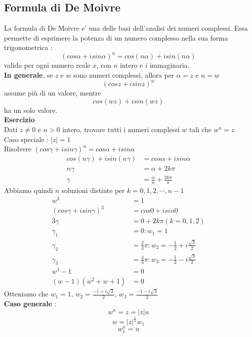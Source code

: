 \documentclass[a4paper, 10pt]{article}
\begin{document}
	\subsection{Formula di De Moivre}
	La formula di De Moivre e' una delle basi dell'analisi dei numeri complessi. 
	Essa permette di esprimere la potenza di un numero complesso nella sua forma trigonometrica : 
	\[
		(cos \alpha + i sin \alpha)^{n} = cos(n\alpha) + isin(n\alpha)
	\]
	valida per ogni numero reale $x$, con $n$ intero e $i$ immaginaria. \\
	\textbf{In generale}, se $z$ e $w$ sono numeri complessi, allora per $\alpha = z$ e $n = w$  
	\[
		(cosz + isinz)^{w}
	\]
	assume più di un valore, mentre
	\[
		cos(wz) + isin(wz)
	\]
	ha un solo valore. \\
	\textbf{Esercizio} \\
	Dati $z \neq 0$ e $n > 0$ intero, trovare tutti i numeri complessi $w$ tali che $w^{n} = z$ \\
	Caso speciale : $\vert z \vert = 1$	\\
	Risolvere $(cos \gamma + i sin \gamma )^{n} = cos \alpha + i sin \alpha $
	\begin{equation*}
		\begin{split}
		cos(n\gamma) + isin(n\gamma) &= cos\alpha + isin\alpha \\
		n\gamma &= \alpha + 2k \pi \\
		\gamma &= \frac{\alpha}{n} + \frac{2k\pi}{n}
		\end{split}
	\end{equation*}
	Abbiamo quindi $n$ soluzioni distinte per $k = 0, 1, 2, \cdots, n - 1$ \\
	\begin{equation*}
		\begin{split}
			w^3 &= 1 \\
			(cos\gamma + isin\gamma)^{3} &= cos 0 + isin0  \\
			3 \gamma &= 0 + 2k\pi (k=0,1,2) \\
			\gamma _{1} &= 0 : w_{1} = 1 \\
			\gamma _{2} &= \frac{2}{3}\pi : w_{2} = - \frac{1}{2} + i \frac{\sqrt{3}}{2} \\
			\gamma _{3} &= \frac{4}{3}\pi : w_{3} = - \frac{1}{2} - i \frac{\sqrt{3}}{2} \\
			w^{3} - 1 &= 0 \\
			(w - 1)(w^2 + w + 1) &= 0
 		\end{split}
	\end{equation*}
	Otteniamo che $w_{1} = 1$, $w_{2} = \frac{-1 + i\sqrt{3}}{2}$, $w_{3} = \frac{-1 - i\sqrt{3}}{2}$ \\
	\textbf{Caso generale} :
	\[ w^n = z = \vert z \vert u \]
	\[ w = \vert z \vert ^{\frac{1}{n}} w_{1} \]
	\[ w^{n}_{1} = u \]
	
\end{document}
